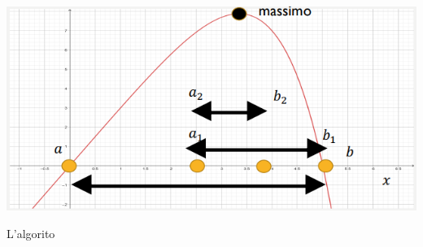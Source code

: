 \documentclass[12pt]{article}
\begin{document}
\begin{center}
    \includegraphics[width = 0.70\linewidth]{Images/95.png}
\end{center}
L'algorito
\end{document}
